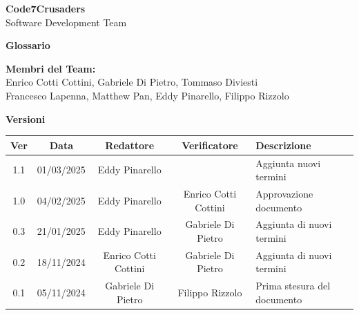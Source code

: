 \documentclass{article}
\begin{document}
\begin{titlepage}
    {\Huge \textbf{Code7Crusaders}}\\
    \vspace{0.5cm}
    {\Large Software Development Team}\\
    \vspace{2cm}
    
    \large \textbf{Glossario}
    \vspace{3.9cm}

    \textbf{Membri del Team:}\\
    Enrico Cotti Cottini, Gabriele Di Pietro, Tommaso Diviesti \\
    Francesco Lapenna, Matthew Pan, Eddy Pinarello, Filippo Rizzolo \\
    \vspace{0.5cm}
    
    \vspace{1cm}
\end{titlepage}



\newpage
\begin{center}
    \textbf{Versioni}
    \\
    \vspace{0.3cm}
    \begin{tabular}{|c|c|c|c|p{5cm}|}
        \hline
        \textbf{Ver} & \textbf{Data} & \textbf{Redattore} & \textbf{Verificatore} & \textbf{Descrizione} \\
        \hline
        1.1 & 01/03/2025 & Eddy Pinarello & & Aggiunta nuovi termini\\
        1.0 & 04/02/2025 & Eddy Pinarello & Enrico Cotti Cottini & Approvazione documento \\
        0.3 & 21/01/2025 & Eddy Pinarello & Gabriele Di Pietro & Aggiunta di nuovi termini \\
        0.2 & 18/11/2024 & Enrico Cotti Cottini & Gabriele Di Pietro & Aggiunta di nuovi termini \\
        0.1 & 05/11/2024 & Gabriele Di Pietro & Filippo Rizzolo & Prima stesura del documento \\
        \hline
    \end{tabular}
\end{center}

\newpage
\tableofcontents
\newpage

\end{document}
